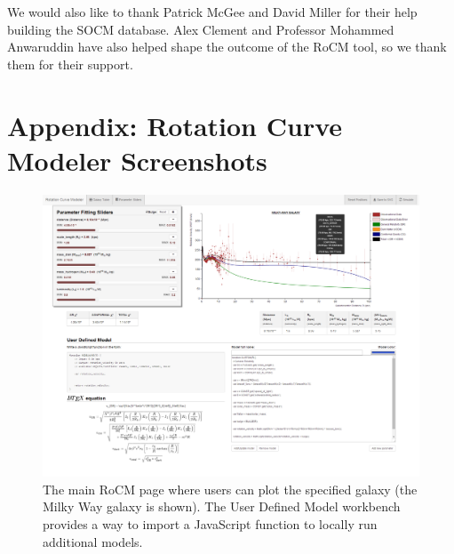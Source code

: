 \documentclass[conference]{IEEEtran-modified}
\begin{document}
We would also like to thank Patrick McGee and David Miller for their help building the SOCM database. Alex Clement and Professor Mohammed Anwaruddin have also helped shape the outcome of the RoCM tool, so we thank them for their support.






\hspace{\textwidth}

\section*{Appendix: Rotation Curve Modeler Screenshots}

\begin{figure}[h!]
\centering
\includegraphics[width=\textwidth, frame, trim = -1cm -1cm -1cm -1cm, clip]{rocm_screenshot_full}
\caption{The main RoCM page where users can plot the specified galaxy (the Milky Way galaxy is shown). The User Defined Model workbench provides a way to import a JavaScript function to locally run additional models.}
\label{rocm_fig}
\end{figure}
\end{document}
